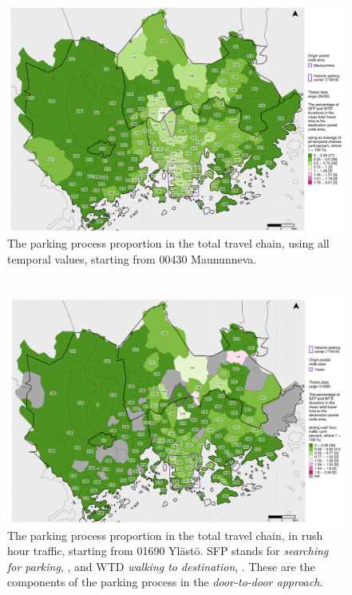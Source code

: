 \begin{figure}
    \section{}
    \centering
    \includegraphics[trim={0.9cm 0.3cm 0.25cm 0.3cm},clip,width=\textwidth]{images/compare_traveltimes_mapfill-msc_all_pct_fromzip-00430_11-10-2020.png}
    \caption[Parking process proportion from Maununneva, all temporal values]{The parking process proportion in the total travel chain, using all temporal values, starting from 00430 Maununneva.}%
    \label{fig:compare_msc_all_pct_00430}%
\end{figure}

\begin{figure}
    \section{}
    \centering
    \includegraphics[trim={0.9cm 0.3cm 0.25cm 0.3cm},clip,width=\textwidth]{images/compare_traveltimes_mapfill-msc_r_pct_fromzip-01690_11-10-2020.png}
    \caption[Parking process proportion from Ylästö, rush hour traffic]{The parking process proportion in the total travel chain, in rush hour traffic, starting from 01690 Ylästö. SFP stands for \textit{searching for parking}, , and WTD \textit{walking to destination}, . These are the components of the parking process in the \textit{door-to-door approach}.}%
    \label{fig:compare_msc_r_pct_01690}%
\end{figure}

